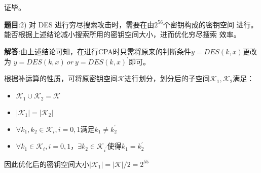 证毕。

\textbf{题目}:2) 对 DES 进行穷尽搜索攻击时，需要在由$2^{56}$个密钥构成的密钥空间
进行。能否根据上述结论减小搜索所用的密钥空间大小，进而优化穷尽搜索
效率。

\textbf{解答}:由上述结论可知，在进行CPA时只需将原来的判断条件$y = DES(k, x)$更改为
$y = DES(k, x)~or~y = DES(k, x)^{\prime}$即可。

根据补运算的性质，可将原密钥空间$\mathcal{K}$进行划分，划分后的子空间$\mathcal{K}_1,\mathcal{K}_2$满足：
\begin{itemize}
    \item $\mathcal{K}_1\cup \mathcal{K}_2 = \mathcal{K}$
    \item $|\mathcal{K}_1|=|\mathcal{K}_2|$
    \item $\forall k_1, k_2 \in \mathcal{K}_i, i = 0, 1$满足$k_1 \neq k_2^{\prime}$
    \item $\forall k_1 \in \mathcal{K}_i, i = 0, 1$，$\exists k_2 \in \mathcal{K}_{i^\prime}$使得$k_1 = k_2^{\prime}$
\end{itemize}

因此优化后的密钥空间大小$|\mathcal{K}_1| = |\mathcal{K}| / 2 = 2^{55}$